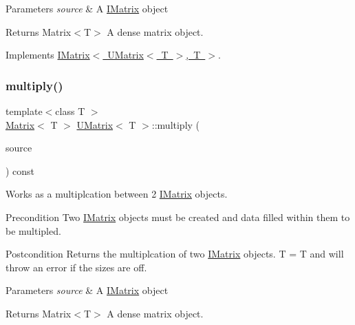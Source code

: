 \begin{DoxyParams}{Parameters}
{\em source} & A \mbox{\hyperlink{class_i_matrix}{I\+Matrix}} object \\
\hline
\end{DoxyParams}
\begin{DoxyReturn}{Returns}
Matrix$<$\+T$>$ A dense matrix object. 
\end{DoxyReturn}


Implements \mbox{\hyperlink{class_i_matrix_aa4d4f7ce2daec7d68ff8fd590652544d}{I\+Matrix$<$ U\+Matrix$<$ T $>$, T $>$}}.

\mbox{\label{class_u_matrix_a834696f0f6c118037fc60efe333b4f13}} 
\subsubsection{\texorpdfstring{multiply()}{multiply()}\hspace{0.1cm}{\footnotesize\ttfamily [5/6]}}
{\footnotesize\ttfamily template$<$class T $>$ \\
\mbox{\hyperlink{class_matrix}{Matrix}}$<$ T $>$ \mbox{\hyperlink{class_u_matrix}{U\+Matrix}}$<$ T $>$\+::multiply (\begin{DoxyParamCaption}\item[{const \mbox{\hyperlink{class_i_matrix}{I\+Matrix}}$<$ \mbox{\hyperlink{class_s_matrix}{S\+Matrix}}$<$ T $>$, T $>$ \&}]{source }\end{DoxyParamCaption}) const}



Works as a multiplcation between 2 \mbox{\hyperlink{class_i_matrix}{I\+Matrix}} objects. 

\begin{DoxyPrecond}{Precondition}
Two \mbox{\hyperlink{class_i_matrix}{I\+Matrix}} objects must be created and data filled within them to be multipled. 
\end{DoxyPrecond}
\begin{DoxyPostcond}{Postcondition}
Returns the multiplcation of two \mbox{\hyperlink{class_i_matrix}{I\+Matrix}} objects. T = T and will throw an error if the sizes are off.
\end{DoxyPostcond}

\begin{DoxyParams}{Parameters}
{\em source} & A \mbox{\hyperlink{class_i_matrix}{I\+Matrix}} object \\
\hline
\end{DoxyParams}
\begin{DoxyReturn}{Returns}
Matrix$<$\+T$>$ A dense matrix object. 
\end{DoxyReturn}
\mbox{\label{class_u_matrix_ad0c8892c5f39a8d51d5537a6b59a8742}} 
